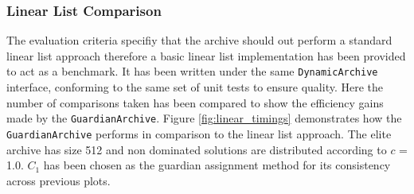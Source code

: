 \documentclass{ecmm427_assignment}
\begin{document}
\subsubsection{Linear List Comparison}
The evaluation criteria specifiy that the archive should out perform a standard linear list approach therefore a basic linear list implementation has been provided to act as a benchmark. It has been written under the same \texttt{DynamicArchive} interface, conforming to the same set of unit tests to ensure quality. Here the number of comparisons taken has been compared to show the efficiency gains made by the \texttt{GuardianArchive}.
Figure \ref{fig:linear_timings} demonstrates how the \texttt{GuardianArchive} performs in comparison to the linear list approach. The elite archive has size 512 and non dominated solutions are distributed according to $c$ = 1.0. $C_1$ has been chosen as the guardian assignment method for its consistency across previous plots.
\end{document}
